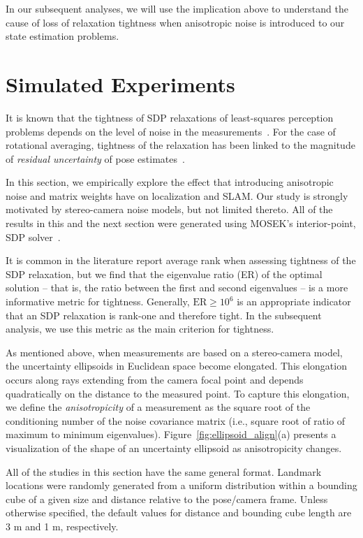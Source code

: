 \documentclass[lettersize,journal]{IEEEtran}
\begin{document}
In our subsequent analyses, we will use the implication above to understand the cause of loss of relaxation tightness when anisotropic noise is introduced to our state estimation problems. 


\section{Simulated Experiments}\label{sec:Simulations}

It is known that the tightness of SDP relaxations of least-squares perception problems depends on the level of noise in the measurements~\cite{brialesConvexGlobal3D2017, rosenSESyncCertifiablyCorrect2019, cifuentesLocalStabilitySemidefinite2022}. For the case of rotational averaging, tightness of the relaxation has been linked to the magnitude of \textit{residual uncertainty} of pose estimates~\cite{erikssonRotationAveragingStrong2018}.

In this section, we empirically explore the effect that introducing anisotropic noise and matrix weights have on localization and SLAM. Our study is strongly motivated by stereo-camera noise models, but not limited thereto. 
All of the results in this and the next section were generated using MOSEK's interior-point, SDP solver~\cite{mosek}.

It is common in the literature report average rank when assessing tightness of the SDP relaxation, but we find that the eigenvalue  ratio (ER) of the optimal solution  -- that is, the ratio between the first and second eigenvalues -- is a more informative metric for tightness. Generally, $\mbox{ER}\geq 10^6$ is an appropriate indicator that an SDP relaxation is rank-one and therefore tight. In the subsequent analysis, we use this metric as the main criterion for tightness. 

As mentioned above, when measurements are based on a stereo-camera model, the uncertainty ellipsoids in Euclidean space become elongated. This elongation occurs along rays extending from the camera focal point and depends quadratically on the distance to the measured point. To capture this elongation, we define the \textit{anisotropicity} of a measurement as the square root of the conditioning number of the noise covariance matrix (i.e., square root of ratio of maximum to minimum eigenvalues). Figure~\ref{fig:ellipsoid_align}(a) presents a visualization of the shape of an uncertainty ellipsoid as anisotropicity changes.

All of the studies in this section have the same general format. Landmark locations were randomly generated from a uniform distribution within a bounding cube of a given size and distance relative to the pose/camera frame. Unless otherwise specified, the default values for distance and bounding cube length are 3 m and 1 m, respectively. 
\end{document}

